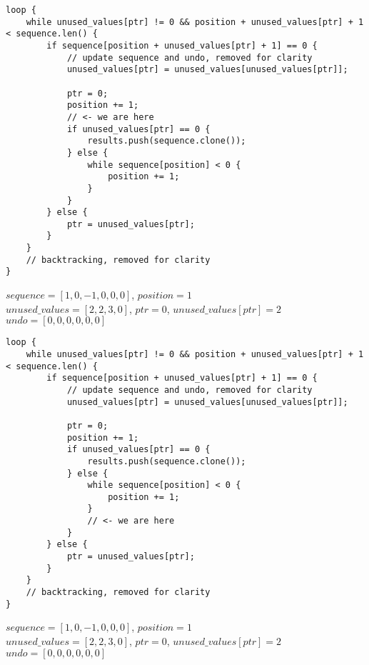 \begin{frame}[fragile]
    \begin{verbatim}
loop {
    while unused_values[ptr] != 0 && position + unused_values[ptr] + 1 < sequence.len() {
        if sequence[position + unused_values[ptr] + 1] == 0 {
            // update sequence and undo, removed for clarity
            unused_values[ptr] = unused_values[unused_values[ptr]];

            ptr = 0;
            position += 1;
            // <- we are here
            if unused_values[ptr] == 0 {
                results.push(sequence.clone());
            } else {
                while sequence[position] < 0 {
                    position += 1;
                }
            }
        } else {
            ptr = unused_values[ptr];
        }
    }
    // backtracking, removed for clarity
}
    \end{verbatim}
    $sequence = [1, 0, -1, 0, 0, 0]$, $position = 1$\\
    $unused\_values = [2, 2, 3, 0]$, $ptr = 0$, $unused\_values[ptr] = 2$\\
    $undo = [0, 0, 0, 0, 0, 0]$
\end{frame}
\begin{frame}[fragile]
    \begin{verbatim}
loop {
    while unused_values[ptr] != 0 && position + unused_values[ptr] + 1 < sequence.len() {
        if sequence[position + unused_values[ptr] + 1] == 0 {
            // update sequence and undo, removed for clarity
            unused_values[ptr] = unused_values[unused_values[ptr]];
            
            ptr = 0;
            position += 1;
            if unused_values[ptr] == 0 {
                results.push(sequence.clone());
            } else {
                while sequence[position] < 0 {
                    position += 1;
                }
                // <- we are here
            }
        } else {
            ptr = unused_values[ptr];
        }
    }
    // backtracking, removed for clarity
}
    \end{verbatim}
    $sequence = [1, 0, -1, 0, 0, 0]$, $position = 1$\\
    $unused\_values = [2, 2, 3, 0]$, $ptr = 0$, $unused\_values[ptr] = 2$\\
    $undo = [0, 0, 0, 0, 0, 0]$
\end{frame}
